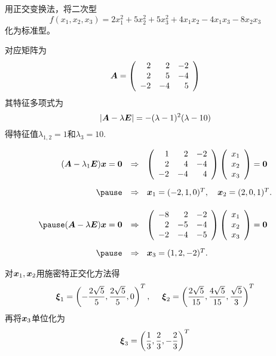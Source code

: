\begin{frame}
  
    \begin{li}[\red{$\bigstar$}]
      用正交变换法，将二次型
      $$
      f(x_1,x_2,x_3)=2x_1^2+5x_2^2+5x_3^2+4x_1x_2-4x_1x_3-8x_2x_3
      $$
      化为标准型。
    \end{li} \pause
    
    \begin{jie}
    对应矩阵为
    $$
    \boldsymbol{A}=\left(
    \begin{array}{rrr}
      2&2&-2\\
      2&5&-4\\
      -2&-4&5
    \end{array}
    \right)
    $$
    \pause
    其特征多项式为
    $$
    |\boldsymbol{A}-\lambda\boldsymbol{E}|=-(\lambda-1)^2(\lambda-10)
    $$
    得特征值$\lambda_{1,2}=1$和$\lambda_3=10$.
    \end{jie}
  
\end{frame}


\begin{frame}
  
    $$
    \begin{array}{rl}
      (\A-\lambda_1\E)\xx=\zero & \Rightarrow~~
      \left(
      \begin{array}{rrr}
        1&2&-2\\
        2&4&-4\\
        -2&-4&4
      \end{array}
      \right)\left(
      \begin{array}{c}
        x_1\\
        x_2\\
        x_3
      \end{array}
      \right)=\zero\\[0.3in] \pause
      & \Rightarrow~~
      \xx_1=(-2,1,0)^T, \quad
      \xx_2=(2,0,1)^T. \\[0.2in]\pause
      (\A-\lambda\E)\xx=\zero & \Rightarrow~~
      \left(
      \begin{array}{rrr}
        -8&2&-2\\
        2&-5&-4\\
        -2&-4&-5
      \end{array}
      \right)\left(
      \begin{array}{c}
        x_1\\
        x_2\\
        x_3
      \end{array}
      \right)=\zero\\[0.3in] \pause
      & \Rightarrow~~
      \xx_3=(1,2,-2)^T.
    \end{array}
    $$ \pause 

    对${\boldsymbol{x}}_1,{\boldsymbol{x}}_2$用施密特正交化方法得
    $$
    \boldsymbol{\xi}_1=\left(-\frac{2\sqrt{5}}5,\frac{2\sqrt{5}}5,0\right)^T,~~~~
    \boldsymbol{\xi}_2=\left(\frac{2\sqrt{5}}{15},\frac{4\sqrt{5}}{15},\frac{\sqrt{5}}3\right)^T
    $$
    再将${\boldsymbol{x}}_3$单位化为
    $$
    \boldsymbol{\xi}_3=\left(\frac13,\frac23,-\frac23\right)^T
    $$
  
\end{frame}


